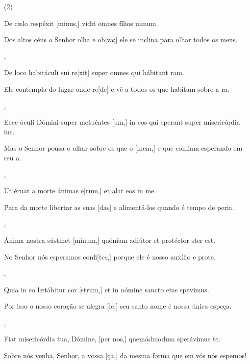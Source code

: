 \SetVersePairs(2){
  {\item {}De cælo respéxit [minus,] vidit omnes fílios \-mi\-num.~\Responsorium}%
    {\item {}Dos altos céus o Senhor olha e ob[va;] ele se inclina para olhar todos os mens.~\Responsorium},
  {\item {}De loco habitáculi sui re[xit] super omnes qui hábitant ram.~\Responsorium}%
    {\item {}Ele contempla do lugar onde re[de] e vê a todos os que habitam sobre a ra.~\Responsorium},
  {\item {}Ecce óculi Dómini super metuéntes [um,] in eos qui sperant super misericórdia ius.~\Responsorium}%
    {\item {}Mas o Senhor pousa o olhar sobre os que o [\-mem,] e que confiam esperando em seu a.~\Responsorium},
  {\item {}Ut éruat a morte ánimas e[rum,] et alat eos in me.~\Responsorium}%
    {\item {}Para da morte libertar as suas [das] e alimentá-los quando é tempo de peria.~\Responsorium},
  {\item {}Ánima nostra sústinet [minum,] quóniam ad\-iútor et protéctor ster est.~\Responsorium}%
    {\item {}No Senhor nós esperamos confi[tes,] porque ele é nosso auxílio e prote.~\Responsorium},
  {\item {}Quia in eo lætábitur cor [strum,] et in nómine sancto eius spevimus.~\Responsorium}%
    {\item {}Por isso o nosso coração se alegra [le,] seu santo nome é nossa única espeça.~\Responsorium},
  {\item {}Fiat misericórdia tua, Dómine, [per nos,] quemádmodum sperávimus  te.~\Responsorium}%
    {\item {}Sobre nós venha, Senhor, a vossa [ça,] da mes\-ma forma que em vós nós espemos!~\Responsorium}
}
